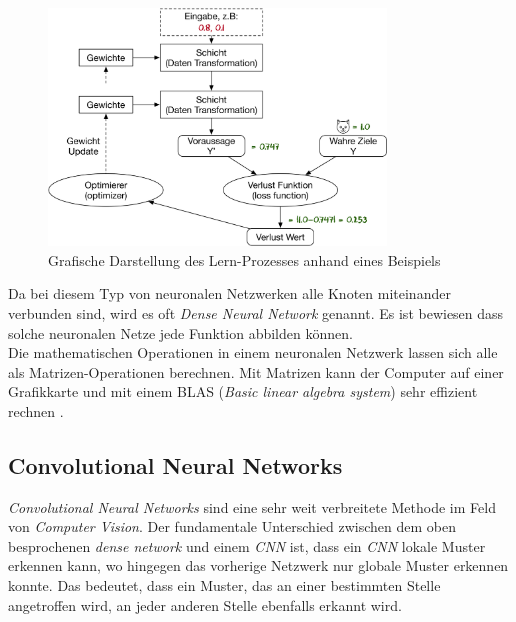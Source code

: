 \begin{figure}[hbt]
	\centering
		\includegraphics[width=0.8\textwidth]{assets/anatomy.png}
	\caption{Grafische Darstellung des Lern-Prozesses anhand eines Beispiels}
	\label{img:anatomy}
\end{figure}

Da bei diesem Typ von neuronalen Netzwerken alle Knoten miteinander verbunden sind, wird es oft \textit{Dense Neural Network} genannt.
Es ist bewiesen dass solche neuronalen Netze jede Funktion abbilden können\parencite[][Kap. 4]{universal}.
\\
Die mathematischen Operationen in einem neuronalen Netzwerk lassen sich alle als Matrizen-Operationen berechnen. Mit Matrizen kann der Computer auf einer Grafikkarte und mit einem BLAS (\textit{Basic linear algebra system}) sehr effizient rechnen \parencite{neuronale_netze} .


\subsection{Convolutional Neural Networks}
\textit{Convolutional Neural Networks} sind eine sehr weit verbreitete Methode im Feld von \textit{Computer Vision}. Der fundamentale Unterschied zwischen dem oben besprochenen \textit{dense network} und einem \textit{CNN} ist, dass ein \textit{CNN} lokale Muster erkennen kann, wo hingegen das vorherige Netzwerk nur globale Muster erkennen konnte. Das bedeutet, dass ein Muster, das an einer bestimmten Stelle angetroffen wird, an jeder anderen Stelle ebenfalls erkannt wird. \parencite{chollet}

